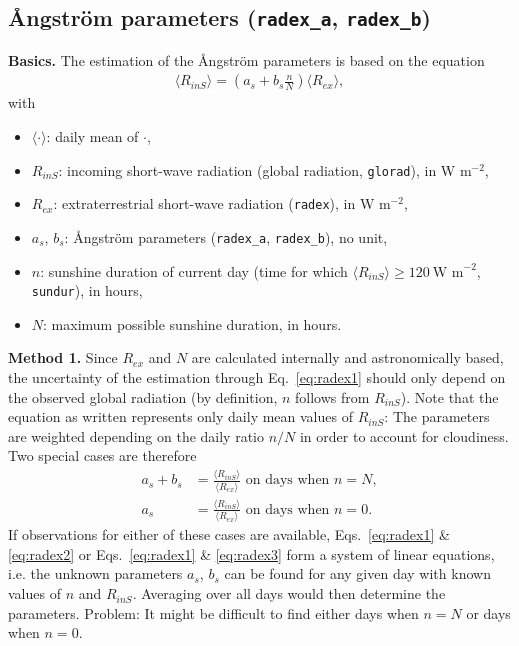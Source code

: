 \documentclass{scrreprt}
\newenvironment{denseitem}{
  \begin{itemize}
    \setlength{\itemsep}{0pt}
    \setlength{\parskip}{0pt}
    \setlength{\parsep}{0pt}
}{
  \end{itemize}
}
\begin{document}
\subsection{{\AA}ngstr\"om parameters (\texttt{radex\_a}, \texttt{radex\_b})} \label{ssec:parest_rad_radex}

\textbf{Basics.}
The estimation of the {\AA}ngstr\"om parameters is based on the equation
\begin{align} \label{eq:radex1}
  \langle R_{inS} \rangle = \left (  a_s + b_s \frac{n}{N} \right ) \langle R_{ex} \rangle,
\end{align}
%
with
\begin{denseitem}
  \item[] $\langle \cdot \rangle$: daily mean of $\cdot$,
  \item[] $R_{inS}$: incoming short-wave radiation (global radiation, \verb!glorad!), in W m$^{-2}$,
  \item[] $R_{ex}$: extraterrestrial short-wave radiation (\verb!radex!), in W m$^{-2}$,
  \item[] $a_s$, $b_s$: {\AA}ngstr\"om parameters (\verb!radex_a!, \verb!radex_b!), no unit,
  \item[] $n$: sunshine duration of current day (time for which $\langle R_{inS} \rangle \geq 120~\text{W~m}^{-2}$, \verb!sundur!), in hours,
  \item[] $N$: maximum possible sunshine duration, in hours.
\end{denseitem}

\textbf{Method 1.}
Since $R_{ex}$ and $N$ are calculated internally and astronomically based, the uncertainty of the estimation through Eq.~\eqref{eq:radex1} should only depend on the observed global radiation (by definition, $n$ follows from $R_{inS}$).
Note that the equation as written represents only daily mean values of $R_{inS}$:
The parameters are weighted depending on the daily ratio $n/N$ in order to account for cloudiness.
Two special cases are therefore
\begin{align}
  a_s + b_s &= \frac{\langle R_{inS} \rangle}{\langle R_{ex} \rangle} \text{ on days when } n=N, \label{eq:radex2} \\
  a_s &= \frac{\langle R_{inS} \rangle}{\langle R_{ex} \rangle} \text{ on days when } n=0. \label{eq:radex3}
\end{align}
%
If observations for either of these cases are available, Eqs.~\eqref{eq:radex1} \& \eqref{eq:radex2} or Eqs.~\eqref{eq:radex1} \& \eqref{eq:radex3} form a system of linear equations, i.e. the unknown parameters $a_s$, $b_s$ can be found for any given day with known values of $n$ and $R_{inS}$.
Averaging over all days would then determine the parameters.
Problem: It might be difficult to find either days when $n=N$ or days when $n=0$.
\end{document}
